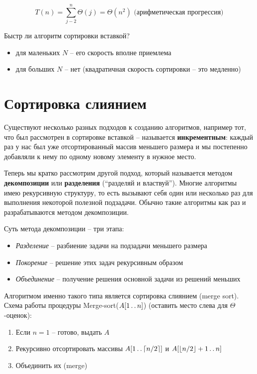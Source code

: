 \documentclass[a4paper,11pt]{article}
\begin{document}
\begin{equation*}
  T(n) = \sum_{j-2}^n{\Theta(j)} = \Theta(n^2) \text{ (арифметическая прогрессия)}
\end{equation*}

Быстр ли алгоритм сортировки вставкой? 
\begin{itemize}
\item для маленьких $N$ -- его скорость вполне приемлема
\item для больших $N$ -- нет (квадратичная скорость сортировки -- это медленно)
\end{itemize}

\section{Сортировка слиянием}

Существуют несколько разных подходов к созданию алгоритмов, например тот, что
был рассмотрен в сортировке вставкой -- называется \textbf{инкрементным}: каждый
раз у нас был уже отсортированный массив меньшего размера и мы постепенно
добавляли к нему по одному новому элементу в нужное место.

Теперь мы кратко рассмотрим другой подход, который называется методом
\textbf{декомпозиции} или \textbf{разделения} (``разделяй и властвуй''). Многие
алгоритмы имею рекурсивную структуру, то есть вызывают себя один или несколько
раз для выполнения некоторой полезной подзадачи. Обычно такие алгоритмы как раз
и разрабатываются методом декомпозиции.

Суть метода декомпозиции -- три этапа:
\begin{itemize}
\item \emph{Разделение} -- разбиение задачи на подзадачи меньшего размера
\item \emph{Покорение} -- решение этих задач рекурсивным образом
\item \emph{Объединение} -- получение решения основной задачи из решений меньших
\end{itemize}

Алгоритмом именно такого типа является сортировка слиянием (merge sort). Схема
работы процедуры Merge-sort($A[1 \mathinner{\ldotp\ldotp} n]$) (оставить место слева для
$\Theta$-оценок):

\begin{enumerate}
\item Если $n = 1$ -- готово, выдать $A$
\item Рекурсивно отсортировать массивы $A[1 \mathinner{\ldotp\ldotp} \lceil n/2 \rceil]$ и $A[\lfloor
  n/2 \rfloor+1 \mathinner{\ldotp\ldotp} n]$
\item Объединить их (merge)
\end{enumerate}
\end{document}
